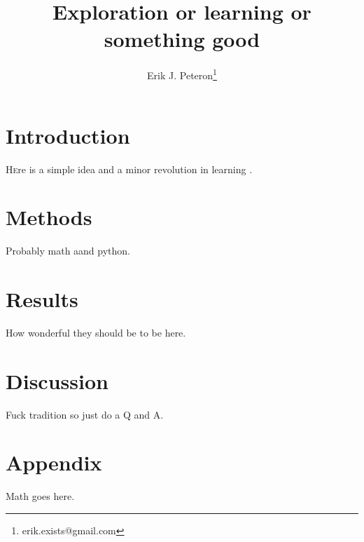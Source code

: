 \documentclass[twoside,twocolumn]{article}
\title{Exploration or learning or something good} %
\author[1]{Erik J. Peteron\thanks{erik.exists@gmail.com}}
\affil[1]{Department of Psychology, Carnegie Mellon University}
\date{} %
\begin{document}
\maketitle
\section{Introduction}
\lettrine[nindent=0em,lines=3]{H} ere is a simple idea and a minor revolution in learning \cite{Wolpert1997a}. 


\section{Methods}
Probably math aand python.


\section{Results}
How wonderful they should be to be here.


\section{Discussion}
Fuck tradition so just do a Q and A.




\section{Appendix}
Math goes here.

\end{document}
